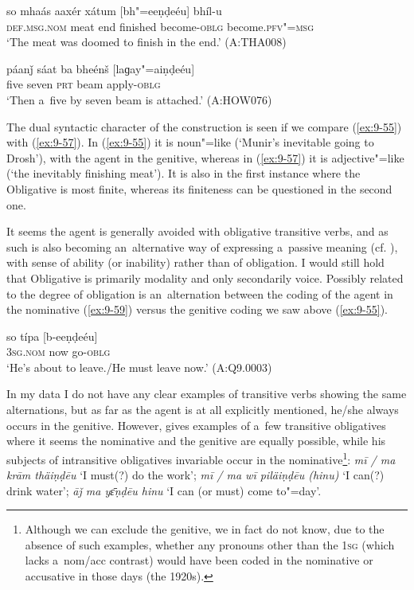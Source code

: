 \begin{exe}
\ex
\label{ex:9-57}
\gll so mhaás aaxér xátum [bh"=eeṇḍeéu] bhíl-u \\
\textsc{def.msg.nom} meat end finished become-\textsc{oblg} become.\textsc{pfv"=msg}  \\
\glt `The meat was doomed to finish in the end.' (A:THA008)

\ex
\label{ex:9-58}
\gll páanǰ sáat ba bheénš [laɡay"=aiṇḍeéu] \\
five seven \textsc{prt} beam apply-\textsc{oblg} \\
\glt `Then a~five by seven beam is attached.' (A:HOW076)
\end{exe}

The dual syntactic character of the construction is seen if we compare (\ref{ex:9-55}) with (\ref{ex:9-57}). In (\ref{ex:9-55}) it is noun"=like (`Munir's inevitable going to Drosh'), with the agent in the genitive, whereas in (\ref{ex:9-57}) it is adjective"=like (`the inevitably finishing meat'). It is also in the first instance where the Obligative is most finite, whereas its finiteness can be questioned in the second one.


It seems the agent is generally avoided with obligative transitive verbs, and as such is also becoming an~alternative way of expressing a~passive meaning (cf. ), with sense of ability (or inability) rather than of obligation. I would still hold that Obligative is primarily modality and only secondarily voice. Possibly related to the degree of obligation is an~alternation between the coding of the agent in the nominative (\ref{ex:9-59}) versus the genitive coding we saw above (\ref{ex:9-55}).

\begin{exe}
\ex
\label{ex:9-59}
\gll so típa [b-eeṇḍeéu] \\
\textsc{3sg.nom} now go-\textsc{oblg} \\
\glt `He's about to leave./He must leave now.' (A:Q9.0003)
\end{exe}

In my data I do not have any clear examples of transitive verbs showing the same alternations, but as far as the agent is at all explicitly mentioned, he/she always occurs in the genitive. However, \citet[24]{morgenstierne1941} gives examples of a~few transitive obligatives where it seems the nominative and the genitive are equally possible, while his subjects of intransitive obligatives invariable occur in the nominative\footnote{Although we can exclude the genitive, we in fact do not know, due to the absence of such examples, whether any pronouns other than the \textsc{1sg} (which lacks a~nom/acc contrast) would have been coded in the nominative or accusative in those days (the 1920s).}: \textit{mī / ma krām thäiṇḍēu} `I must(?) do the work'; \textit{mī / ma wī piläiṇḍēu (hinu)} `I can(?) drink water'; \textit{āǰ ma yɛ̄ṇḍēu hinu} `I can (or must) come to"=day'.


